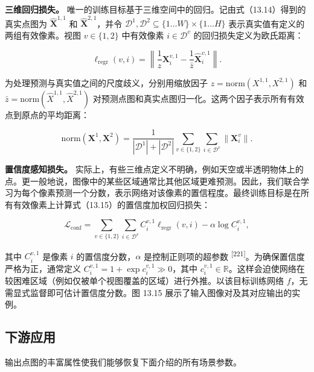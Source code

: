 \textbf{三维回归损失。} 唯一的训练目标基于三维空间中的回归。记由式（13.14）得到的真实点图为 $\hat{\pmb X}^{1,1}$ 和 $\hat{\pmb X}^{2,1}$，并令 $\mathcal{D}^1,\mathcal{D}^2\subseteq\{1\ldots W\}\times\{1\ldots H\}$ 表示真实值有定义的两组有效像素。视图 $v\in\{1,2\}$ 中有效像素 $i\in\mathcal{D}^v$ 的回归损失定义为欧氏距离：

\begin{equation}
\ell_ {\mathrm{regr}} (v, i) = \left\| \frac {1}{z} \boldsymbol {X} _ {i} ^ {v, 1} - \frac {1}{\bar {z}} \hat {\boldsymbol {X}} _ {i} ^ {v, 1} \right\|.\tag{13.15}
\end{equation}

为处理预测与真实值之间的尺度歧义，分别用缩放因子 $z=\mathrm{norm}(X^{1,1},X^{2,1})$ 和 $\bar z=\mathrm{norm}(\hat X^{1,1},\hat X^{2,1})$ 对预测点图和真实点图归一化。这两个因子表示所有有效点到原点的平均距离：

\begin{equation}
\mathrm{norm} (\boldsymbol {X} ^ {1}, \boldsymbol {X} ^ {2}) = \frac {1}{| \mathcal {D} ^ {1} | + | \mathcal {D} ^ {2} |} \sum_ {v \in \{1, 2 \}} \sum_ {i \in \mathcal {D} ^ {v}} \| \boldsymbol {X} _ {i} ^ {v} \|.\tag{13.16}
\end{equation}

\textbf{置信度感知损失。} 实际上，有些三维点定义不明确，例如天空或半透明物体上的点。更一般地说，图像中的某些区域通常比其他区域更难预测。因此，我们联合学习为每个像素预测一个分数，表示网络对该像素的置信程度。最终训练目标是在所有有效像素上计算式（13.15）的置信度加权回归损失：

\begin{equation}
\mathcal {L} _ {\mathrm{conf}} = \sum _ {v \in \{1, 2 \}} \sum _ {i \in \mathcal {D} ^ {v}} C _ {i} ^ {v, 1} \ell_ {\mathrm{regr}} (v, i) - \alpha \log C _ {i} ^ {v, 1},\tag{13.17}
\end{equation}

其中 $C_i^{v,1}$ 是像素 $i$ 的置信度分数，$\alpha$ 是控制正则项的超参数 \textsuperscript{[221]}。为确保置信度严格为正，通常定义 $C_i^{v,1}=1+\exp c_i^{v,1}\gg0$，其中 $c_i^{v,1}\in\mathbb{R}$。这样会迫使网络在较困难区域（例如仅被单个视图覆盖的区域）进行外推。以该目标训练网络 $f$，无需显式监督即可估计置信度分数。图 13.15 展示了输入图像对及其对应输出的实例。

\subsection{下游应用}

输出点图的丰富属性使我们能够恢复下面介绍的所有场景参数。

